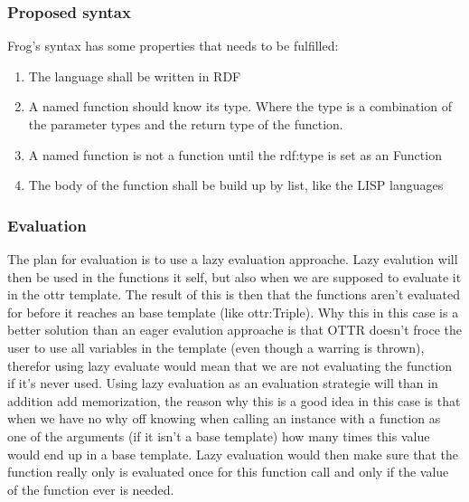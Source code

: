 \subsubsection{Proposed syntax}
Frog's syntax has some properties that needs to be fulfilled: 
\begin{enumerate}
    \item The language shall be written in RDF 
    \item A named function should know its type. Where the type is a combination of the parameter types 
    and the return type of the function.
    \item A named function is not a function until the rdf:type is set as an Function
    \item The body of the function shall be build up by list, like the LISP languages
\end{enumerate}



\subsubsection{Evaluation}
The plan for evaluation is to use a lazy evaluation approache. Lazy evalution will then be used in the functions it self, 
but also when we are supposed to evaluate it in the ottr template. The result of this is then that the functions aren't evaluated 
for before it reaches an base template (like ottr:Triple). Why this in this case is a better solution than an eager evalution 
approache is that OTTR doesn't froce the user to use all variables in the template (even though a warring is thrown), therefor using 
lazy evaluate would mean that we are not evaluating the function if it's never used. Using lazy evaluation as an evaluation 
strategie will than in addition add memorization, the reason why this is a good idea in this case is that when we have no why 
off knowing when calling an instance with a function as one of the arguments (if it isn't a base template) how many times this 
value would end up in a base template. Lazy evaluation would then make sure that the function really only is evaluated once for this 
function call and only if the value of the function ever is needed. 

